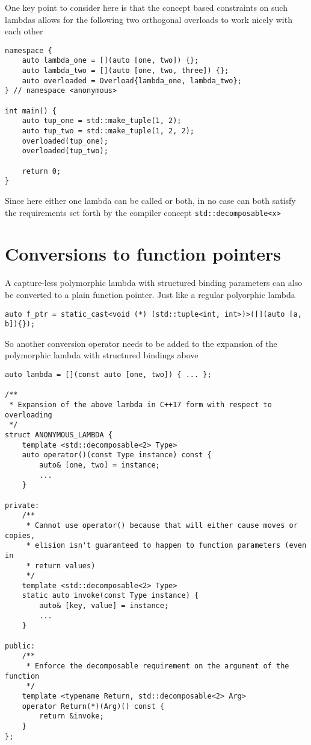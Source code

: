 \documentclass{article}
\begin{document}
One key point to consider here is that the concept based constraints on such
lambdas allows for the following two orthogonal overloads to work nicely with
each other

\begin{lstlisting}
namespace {
    auto lambda_one = [](auto [one, two]) {};
    auto lambda_two = [](auto [one, two, three]) {};
    auto overloaded = Overload{lambda_one, lambda_two};
} // namespace <anonymous>

int main() {
    auto tup_one = std::make_tuple(1, 2);
    auto tup_two = std::make_tuple(1, 2, 2);
    overloaded(tup_one);
    overloaded(tup_two);

    return 0;
}
\end{lstlisting}

Since here either one lambda can be called or both, in no case can both
satisfy the requirements set forth by the compiler concept
\texttt{std::decomposable<x>}


\section{Conversions to function pointers}
A capture-less polymorphic lambda with structured binding parameters can also
be converted to a plain function pointer.  Just like a regular polyorphic
lambda

\begin{lstlisting}
auto f_ptr = static_cast<void (*) (std::tuple<int, int>)>([](auto [a, b]){});
\end{lstlisting}

So another conversion operator needs to be added to the expansion of the
polymorphic lambda with structured bindings above

\begin{lstlisting}
auto lambda = [](const auto [one, two]) { ... };

/**
 * Expansion of the above lambda in C++17 form with respect to overloading
 */
struct ANONYMOUS_LAMBDA {
    template <std::decomposable<2> Type>
    auto operator()(const Type instance) const {
        auto& [one, two] = instance;
        ...
    }

private:
    /**
     * Cannot use operator() because that will either cause moves or copies,
     * elision isn't guaranteed to happen to function parameters (even in
     * return values)
     */
    template <std::decomposable<2> Type>
    static auto invoke(const Type instance) {
        auto& [key, value] = instance;
        ...
    }

public:
    /**
     * Enforce the decomposable requirement on the argument of the function
     */
    template <typename Return, std::decomposable<2> Arg>
    operator Return(*)(Arg)() const {
        return &invoke;
    }
};
\end{lstlisting}
\end{document}
